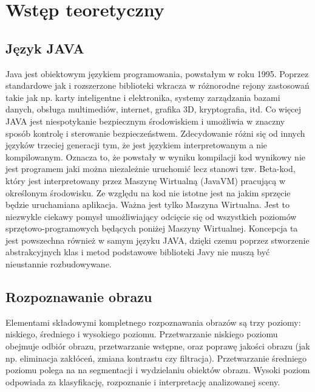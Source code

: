 \section{Wstęp teoretyczny}

\subsection{Język JAVA}
Java jest obiektowym językiem programowania, powstałym w roku 1995. Poprzez standardowe jak i rozszerzone biblioteki wkracza w różnorodne rejony zastosowań takie jak np. karty inteligentne i elektronika, systemy zarządzania bazami danych, obsługa multimediów, internet, grafika 3D, kryptografia, itd. Co więcej JAVA jest niespotykanie bezpiecznym środowiskiem i umożliwia w znaczny sposób kontrolę i sterowanie bezpieczeństwem. Zdecydowanie różni się od innych języków trzeciej generacji tym, że jest językiem interpretowanym a nie kompilowanym. Oznacza to, że powstały w wyniku kompilacji kod wynikowy nie jest programem jaki można niezależnie uruchomić lecz stanowi tzw. Beta-kod, który jest interpretowany przez Maszynę Wirtualną (JavaVM) pracującą w określonym środowisku. Ze względu na kod nie istotne jest na jakim sprzęcie będzie uruchamiana aplikacja. Ważna jest tylko Maszyna Wirtualna. Jest to niezwykle ciekawy pomysł umożliwiający odcięcie się od wszystkich poziomów sprzętowo-programowych będących poniżej Maszyny Wirtualnej. Koncepcja ta jest powszechna również w samym języku JAVA, dzięki czemu poprzez stworzenie abstrakcyjnych klas i metod podstawowe biblioteki Javy nie muszą być nieustannie rozbudowywane.

\subsection{Rozpoznawanie obrazu}
Elementami składowymi kompletnego rozpoznawania obrazów są trzy poziomy: niskiego, średniego i wysokiego poziomu. Przetwarzanie niskiego poziomu obejmuje odbiór obrazu, przetwarzanie wstępne, oraz poprawę jakości obrazu (jak np. eliminacja zakłóceń, zmiana kontrastu czy filtracja). Przetwarzanie średniego poziomu polega na na segmentacji i wydzielaniu obiektów obrazu. Wysoki poziom odpowiada za klasyfikację, rozpoznanie i interpretację analizowanej sceny.

